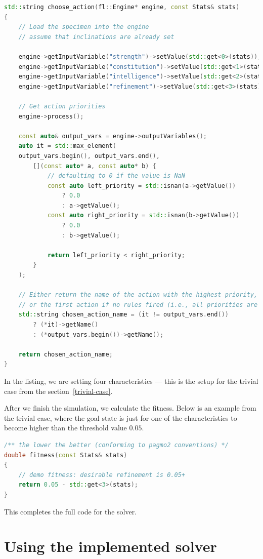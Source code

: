 \documentclass[12pt, a4paper]{report}
\begin{document}
	\begin{lstlisting}[language=c++]
std::string choose_action(fl::Engine* engine, const Stats& stats)
{
	// Load the specimen into the engine
	// assume that inclinations are already set
	
	engine->getInputVariable("strength")->setValue(std::get<0>(stats));
	engine->getInputVariable("constitution")->setValue(std::get<1>(stats));
	engine->getInputVariable("intelligence")->setValue(std::get<2>(stats));
	engine->getInputVariable("refinement")->setValue(std::get<3>(stats));
	
	// Get action priorities
	engine->process();
	
	const auto& output_vars = engine->outputVariables();
	auto it = std::max_element(
	output_vars.begin(), output_vars.end(),
		[](const auto* a, const auto* b) {
			// defaulting to 0 if the value is NaN
			const auto left_priority = std::isnan(a->getValue()) 
				? 0.0 
				: a->getValue();
			const auto right_priority = std::isnan(b->getValue()) 
				? 0.0 
				: b->getValue();
			
			return left_priority < right_priority;
		}
	);
	
	// Either return the name of the action with the highest priority,
	// or the first action if no rules fired (i.e., all priorities are 0).
	std::string chosen_action_name = (it != output_vars.end())
		? (*it)->getName()
		: (*output_vars.begin())->getName();
	
	return chosen_action_name;
}
	\end{lstlisting}

	In the listing, we are setting four characteristics --- this is the setup for the trivial case from the section~\ref{trivial-case}.
		
	After we finish the simulation, we calculate the fitness.
	Below is an example from the trivial case, where the goal state is just for one of the characteristics to become higher than the threshold value $0.05$.
	
	\begin{lstlisting}[language=c++]
/** the lower the better (conforming to pagmo2 conventions) */
double fitness(const Stats& stats)
{
	// demo fitness: desirable refinement is 0.05+
	return 0.05 - std::get<3>(stats);
}
	\end{lstlisting}

	This completes the full code for the solver.
	
	\section{Using the implemented solver}
	
\end{document}
